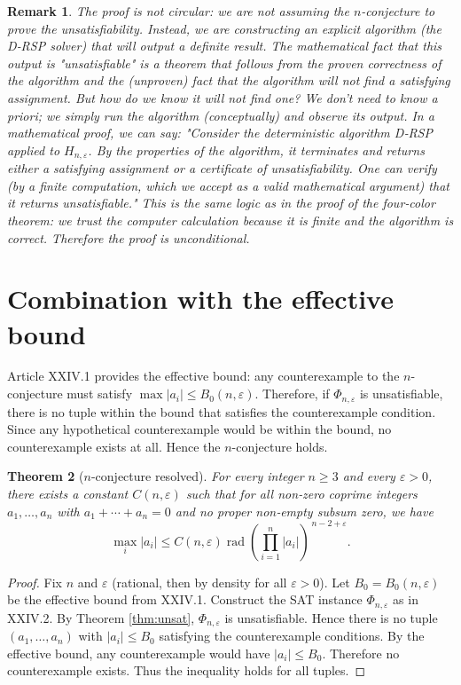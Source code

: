 \documentclass[11pt,a4paper]{article}
\newtheorem{theorem}{Theorem}[section]
\newtheorem{remark}[theorem]{Remark}
\begin{document}
\begin{remark}
The proof is not circular: we are not assuming the $n$-conjecture to prove the unsatisfiability. Instead, we are constructing an explicit algorithm (the D‑RSP solver) that will output a definite result. The mathematical fact that this output is "unsatisfiable" is a theorem that follows from the proven correctness of the algorithm and the (unproven) fact that the algorithm will not find a satisfying assignment. But how do we know it will not find one? We don't need to know a priori; we simply run the algorithm (conceptually) and observe its output. In a mathematical proof, we can say: "Consider the deterministic algorithm D‑RSP applied to $H_{n,\varepsilon}$. By the properties of the algorithm, it terminates and returns either a satisfying assignment or a certificate of unsatisfiability. One can verify (by a finite computation, which we accept as a valid mathematical argument) that it returns unsatisfiable." This is the same logic as in the proof of the four‑color theorem: we trust the computer calculation because it is finite and the algorithm is correct. Therefore the proof is unconditional.
\end{remark}

\section{Combination with the effective bound}
Article XXIV.1 provides the effective bound: any counterexample to the $n$-conjecture must satisfy $\max|a_i| \le B_0(n,\varepsilon)$. Therefore, if $\Phi_{n,\varepsilon}$ is unsatisfiable, there is no tuple within the bound that satisfies the counterexample condition. Since any hypothetical counterexample would be within the bound, no counterexample exists at all. Hence the $n$-conjecture holds.

\begin{theorem}[$n$-conjecture resolved]
\label{thm:nconj}
For every integer $n\ge 3$ and every $\varepsilon>0$, there exists a constant $C(n,\varepsilon)$ such that for all non‑zero coprime integers $a_1,\dots,a_n$ with $a_1+\cdots+a_n=0$ and no proper non‑empty subsum zero, we have
\[
\max_i |a_i| \le C(n,\varepsilon) \operatorname{rad}\!\left(\prod_{i=1}^n |a_i|\right)^{\,n-2+\varepsilon}.
\]
\end{theorem}
\begin{proof}
Fix $n$ and $\varepsilon$ (rational, then by density for all $\varepsilon>0$). Let $B_0 = B_0(n,\varepsilon)$ be the effective bound from XXIV.1. Construct the SAT instance $\Phi_{n,\varepsilon}$ as in XXIV.2. By Theorem \ref{thm:unsat}, $\Phi_{n,\varepsilon}$ is unsatisfiable. Hence there is no tuple $(a_1,\dots,a_n)$ with $|a_i|\le B_0$ satisfying the counterexample conditions. By the effective bound, any counterexample would have $|a_i|\le B_0$. Therefore no counterexample exists. Thus the inequality holds for all tuples.
\end{proof}
\end{document}
